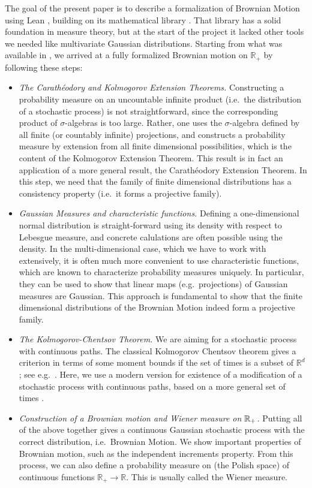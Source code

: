 \documentclass[lean]{Draft}
\begin{document}
The goal of the present paper is to describe a formalization of Brownian Motion using Lean \cite{lean, moura2021lean}, building on its mathematical library \mathlib \cite{mathlib}.
That library has a solid foundation in measure theory, but at the start of the project it lacked other tools we needed like multivariate Gaussian distributions.
Starting from what was available in \mathlib, we arrived at a fully formalized Brownian motion on $\mathbb{R}_+$ by following these steps:
\begin{itemize}
\item {\em The Carathéodory and Kolmogorov Extension Theorems.} Constructing a probability measure on an uncountable infinite product (i.e.\ the distribution of a stochastic process) is not straightforward, since the corresponding product of $\sigma$-algebras is too large.
Rather, one uses the $\sigma$-algebra defined by all finite (or countably infinite) projections, and constructs a probability measure by extension from all finite dimensional possibilities, which is the content of the Kolmogorov Extension Theorem. This result is in fact an application of a more general result, the Carathéodory Extension Theorem. In this step, we need that the family of finite dimensional distributions has a consistency property (i.e.\ it forms a projective family).
\item {\em Gaussian Measures and characteristic functions.} Defining a one-dimensional normal distribution is straight-forward using its density with respect to Lebesgue measure, and concrete calulations are often possible using the density. In the multi-dimensional case, which we have to work with extensively, it is often much more convenient to use characteristic functions, which are known to characterize probability measures uniquely.
In particular, they can be used to show that linear maps (e.g.\ projections) of Gaussian measures are Gaussian. This approach is fundamental to show that the finite dimensional distributions of the Brownian Motion indeed form a projective family.
\item {\em The Kolmogorov-Chentsov Theorem.} We are aiming for a stochastic process with continuous paths. The classical Kolmogorov Chentsov theorem gives a criterion in terms of some moment bounds if the set of times is a subset of $\mathbb R^d$; see e.g.\ \cite{kallenberg2021}. Here, we use a modern version for existence of a modification of a stochastic process with continuous paths, based on a more general set of times \cite{kratschmer2023kolmogorov}.
\item {\em Construction of a Brownian motion and Wiener measure on $\mathbb{R}_+$.} Putting all of the above together gives a continuous Gaussian stochastic process with the correct distribution, i.e.\ Brownian Motion.
We show important properties of Brownian motion, such as the independent increments property.
From this process, we can also define a probability measure on (the Polish space) of continuous functions $\mathbb R_+ \to \mathbb R$. This is usually called the Wiener measure.
\end{itemize}
\end{document}
